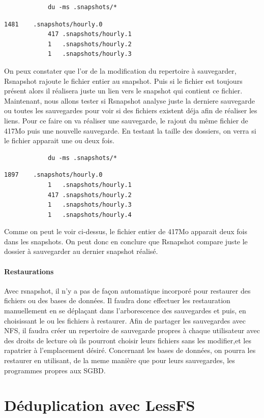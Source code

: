 \documentclass[a4paper]{report}
\begin{document}
		\begin{lstlisting}
			du -ms .snapshots/*
		\end{lstlisting}
		\begin{lstlisting}[backgroundcolor=\color{yellow}]
			1481	.snapshots/hourly.0
			417	.snapshots/hourly.1
			1	.snapshots/hourly.2
			1	.snapshots/hourly.3
		\end{lstlisting}
		On peux constater que l'or de la modification du repertoire à sauvegarder, Rsnapshot rajoute le fichier entier au snapshot. Puis si le fichier est toujours présent alors il réalisera juste un lien vers le snapshot qui contient ce fichier. Maintenant, nous allons tester si Rsnapshot analyse juste la derniere sauvegarde ou toutes les sauvegardes pour voir si des fichiers existent déja afin de réaliser les liens. Pour ce faire on va réaliser une sauvegarde, le rajout du même fichier de 417Mo puis une nouvelle sauvegarde. En testant la taille des dossiers, on verra si le fichier apparait une ou deux fois.
		\begin{lstlisting}
			du -ms .snapshots/*
		\end{lstlisting}
		\begin{lstlisting}[backgroundcolor=\color{yellow}]
			1897	.snapshots/hourly.0
			1	.snapshots/hourly.1
			417	.snapshots/hourly.2
			1	.snapshots/hourly.3
			1	.snapshots/hourly.4
		\end{lstlisting}
		Comme on peut le voir ci-dessus, le fichier entier de 417Mo apparait deux fois dans les snapshots. On peut donc en conclure que Rsnapshot compare juste le dossier à sauvegarder au dernier snapshot réalisé.
		\subsubsection{Restaurations}
			Avec rsnapshot, il n'y a pas de façon automatique incorporé pour restaurer des fichiers ou des bases de données. Il faudra donc effectuer les restauration manuellement en se déplaçant dans l'arborescence des sauvegardes et puis, en choisissant le ou les fichiers à restaurer. Afin de partager les sauvegardes avec NFS, il faudra créer un repertoire de sauvegarde propres à chaque utilisateur avec des droits de lecture où ils pourront choisir leurs fichiers sans les modifier,et les rapatrier à l'emplacement désiré. Concernant les bases de données, on pourra les restaurer en utilisant, de la meme manière que pour leurs sauvegardes, les programmes propres aux SGBD.
	\chapter{Déduplication avec LessFS}
\end{document}
